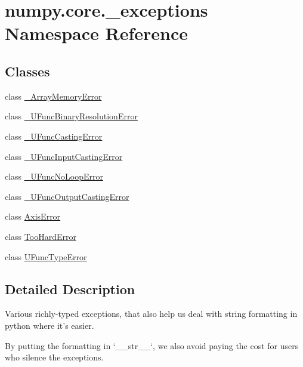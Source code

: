 \hypertarget{namespacenumpy_1_1core_1_1__exceptions}{}\section{numpy.\+core.\+\_\+exceptions Namespace Reference}
\label{namespacenumpy_1_1core_1_1__exceptions}
\subsection*{Classes}
\begin{DoxyCompactItemize}
\item 
class \hyperlink{classnumpy_1_1core_1_1__exceptions_1_1__ArrayMemoryError}{\+\_\+\+Array\+Memory\+Error}
\item 
class \hyperlink{classnumpy_1_1core_1_1__exceptions_1_1__UFuncBinaryResolutionError}{\+\_\+\+U\+Func\+Binary\+Resolution\+Error}
\item 
class \hyperlink{classnumpy_1_1core_1_1__exceptions_1_1__UFuncCastingError}{\+\_\+\+U\+Func\+Casting\+Error}
\item 
class \hyperlink{classnumpy_1_1core_1_1__exceptions_1_1__UFuncInputCastingError}{\+\_\+\+U\+Func\+Input\+Casting\+Error}
\item 
class \hyperlink{classnumpy_1_1core_1_1__exceptions_1_1__UFuncNoLoopError}{\+\_\+\+U\+Func\+No\+Loop\+Error}
\item 
class \hyperlink{classnumpy_1_1core_1_1__exceptions_1_1__UFuncOutputCastingError}{\+\_\+\+U\+Func\+Output\+Casting\+Error}
\item 
class \hyperlink{classnumpy_1_1core_1_1__exceptions_1_1AxisError}{Axis\+Error}
\item 
class \hyperlink{classnumpy_1_1core_1_1__exceptions_1_1TooHardError}{Too\+Hard\+Error}
\item 
class \hyperlink{classnumpy_1_1core_1_1__exceptions_1_1UFuncTypeError}{U\+Func\+Type\+Error}
\end{DoxyCompactItemize}


\subsection{Detailed Description}
\begin{DoxyVerb}Various richly-typed exceptions, that also help us deal with string formatting
in python where it's easier.

By putting the formatting in `__str__`, we also avoid paying the cost for
users who silence the exceptions.
\end{DoxyVerb}
 